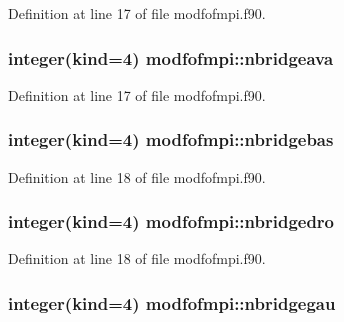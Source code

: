 Definition at line 17 of file modfofmpi.\+f90.

\subsubsection[{\texorpdfstring{nbridgeava}{nbridgeava}}]{\setlength{\rightskip}{0pt plus 5cm}integer(kind=4) modfofmpi\+::nbridgeava}\hypertarget{namespacemodfofmpi_a2ce30cec8604582ad8aaa26ef19b41cb}{}\label{namespacemodfofmpi_a2ce30cec8604582ad8aaa26ef19b41cb}


Definition at line 17 of file modfofmpi.\+f90.

\subsubsection[{\texorpdfstring{nbridgebas}{nbridgebas}}]{\setlength{\rightskip}{0pt plus 5cm}integer(kind=4) modfofmpi\+::nbridgebas}\hypertarget{namespacemodfofmpi_ad71e96722537b8de69afdb8f68028e8b}{}\label{namespacemodfofmpi_ad71e96722537b8de69afdb8f68028e8b}


Definition at line 18 of file modfofmpi.\+f90.

\subsubsection[{\texorpdfstring{nbridgedro}{nbridgedro}}]{\setlength{\rightskip}{0pt plus 5cm}integer(kind=4) modfofmpi\+::nbridgedro}\hypertarget{namespacemodfofmpi_a0253e42a34623e4816f27522252d1e29}{}\label{namespacemodfofmpi_a0253e42a34623e4816f27522252d1e29}


Definition at line 18 of file modfofmpi.\+f90.

\subsubsection[{\texorpdfstring{nbridgegau}{nbridgegau}}]{\setlength{\rightskip}{0pt plus 5cm}integer(kind=4) modfofmpi\+::nbridgegau}\hypertarget{namespacemodfofmpi_a000b4f4f0140c24648780b86d56698cf}{}\label{namespacemodfofmpi_a000b4f4f0140c24648780b86d56698cf}


